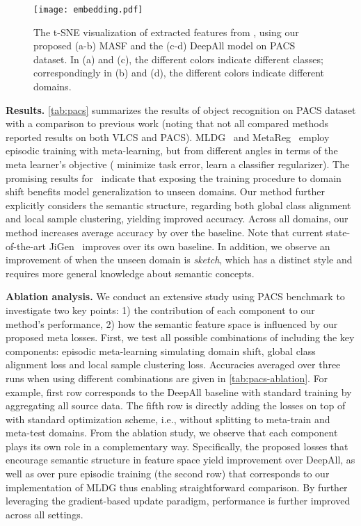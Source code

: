 \documentclass{article}
\begin{document}
\begin{figure}[t]
    \centering
    \texttt{[image: embedding.pdf]}
\caption{The t-SNE visualization of extracted features from , using our proposed (a-b) MASF and the (c-d) DeepAll model on PACS dataset. In (a) and (c), the different colors indicate different classes; correspondingly in (b) and (d), the different colors indicate different domains.}
    \label{fig:tsne}
\end{figure}

\textbf{Results.} \cref{tab:pacs} summarizes the results of object recognition on PACS dataset with a comparison to previous work (noting that not all compared methods reported results on both VLCS and PACS). MLDG~\citep{li2018learning} and MetaReg~\citep{balaji2018metareg} employ episodic training with meta-learning, but from different angles in terms of the meta learner's objective (\citet{li2018learning} minimize task error, \citet{balaji2018metareg} learn a classifier regularizer).
The promising results for~\citep{balaji2018metareg,li2018learning,li2019episodic} indicate that exposing the training procedure to domain shift benefits model generalization to unseen domains. Our method further explicitly considers the semantic structure, regarding both global class alignment and local sample clustering, yielding improved accuracy. Across all domains, our method increases average accuracy by  over the baseline.
Note that current state-of-the-art JiGen~\citep{carlucci2019domain} improves  over its own baseline.
In addition, we observe an improvement of  when the unseen domain is \textit{sketch}, which has a distinct style and requires more general knowledge about semantic concepts.

\textbf{Ablation analysis.} We conduct an extensive study using PACS benchmark to investigate two key points: 1) the contribution of each component to our method's performance, 2) how the semantic feature space is influenced by our proposed meta losses.
First, we test all possible combinations of including the key components: episodic meta-learning simulating domain shift, global class alignment loss and local sample clustering loss. 
Accuracies averaged over three runs when using different combinations are given in \cref{tab:pacs-ablation}. For example, first row corresponds to the DeepAll baseline with standard training by aggregating all source data. The fifth row is directly adding the  losses on top of  with standard optimization scheme, i.e., without splitting  to meta-train and meta-test domains. From the ablation study, we observe that each component plays its own role in a complementary way. Specifically, the proposed losses that encourage semantic structure in feature space yield improvement over DeepAll, as well as over pure episodic training (the second row) that corresponds to our implementation of MLDG thus enabling straightforward comparison. By further leveraging the gradient-based update paradigm, performance is further improved across all settings.
\end{document}
